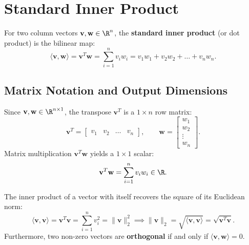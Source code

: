 \FloatBarrier
\section{Standard Inner Product}

\begin{definition}
For two column vectors $\mathbf{v}, \mathbf{w} \in \R^n$, the \textbf{standard inner product} (or dot product) is the bilinear map:
\begin{equation}
    \langle \mathbf{v}, \mathbf{w} \rangle = \mathbf{v}^T \mathbf{w} = \sum_{i=1}^n v_i w_i = v_1 w_1 + v_2 w_2 + \dots + v_n w_n.
\end{equation}
\end{definition}

\subsection{Matrix Notation and Output Dimensions}

Since $\mathbf{v}, \mathbf{w} \in \R^{n \times 1}$, the transpose $\mathbf{v}^T$ is a $1 \times n$ row matrix:
\begin{equation}
    \mathbf{v}^T = \begin{bmatrix} v_1 & v_2 & \dots & v_n \end{bmatrix}, \qquad \mathbf{w} = \begin{bmatrix} w_1 \\ w_2 \\ \vdots \\ w_n \end{bmatrix}.
\end{equation}
Matrix multiplication $\mathbf{v}^T \mathbf{w}$ yields a $1 \times 1$ scalar:
\begin{equation}
    \mathbf{v}^T \mathbf{w} = \sum_{i=1}^n v_i w_i \in \R.
\end{equation}

\begin{property}
The inner product of a vector with itself recovers the square of its Euclidean norm:
\begin{equation}
    \langle \mathbf{v}, \mathbf{v} \rangle = \mathbf{v}^T \mathbf{v} = \sum_{i=1}^n v_i^2 = \|\mathbf{v}\|_2^2 \implies \|\mathbf{v}\|_2 = \sqrt{\langle \mathbf{v}, \mathbf{v} \rangle} = \sqrt{\mathbf{v}^T \mathbf{v}}.
\end{equation}
Furthermore, two non-zero vectors are \textbf{orthogonal} if and only if $\langle \mathbf{v}, \mathbf{w} \rangle = 0$.
\end{property}

